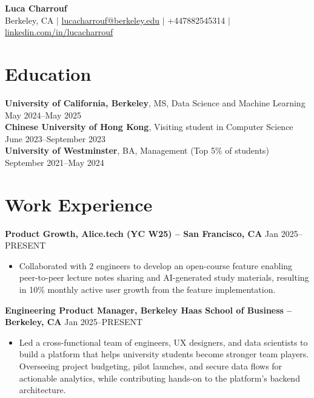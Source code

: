\documentclass{article}
\begin{document}
\begin{center}
    \huge\textbf{Luca Charrouf}\\[0.2cm]
    \normalsize
    Berkeley, CA $|$ \href{mailto:lucacharrouf@berkeley.edu}{lucacharrouf@berkeley.edu} $|$ +447882545314 $|$ \href{https://linkedin.com/in/lucacharrouf}{linkedin.com/in/lucacharrouf}
\end{center}

\section*{Education}
\textbf{University of California, Berkeley}, MS, Data Science and Machine Learning \hfill May 2024--May 2025\\
\textbf{Chinese University of Hong Kong}, Visiting student in Computer Science \hfill June 2023--September 2023\\
\textbf{University of Westminster}, BA, Management (Top 5\% of students) \hfill September 2021--May 2024

\section*{Work Experience}
\textbf{Product Growth, Alice.tech (YC W25) -- San Francisco, CA} \hfill Jan 2025--PRESENT
\begin{itemize}[leftmargin=*,noitemsep]
    \item Collaborated with 2 engineers to develop an open-course feature enabling peer-to-peer lecture notes sharing and AI-generated study materials, resulting in 10\% monthly active user growth from the feature implementation.
\end{itemize}

\textbf{Engineering Product Manager, Berkeley Haas School of Business -- Berkeley, CA} \hfill Jan 2025--PRESENT
\begin{itemize}[leftmargin=*,noitemsep]
    \item Led a cross-functional team of engineers, UX designers, and data scientists to build a platform that helps university students become stronger team players. Overseeing project budgeting, pilot launches, and secure data flows for actionable analytics, while contributing hands-on to the platform's backend architecture.
\end{itemize}
\end{document}
